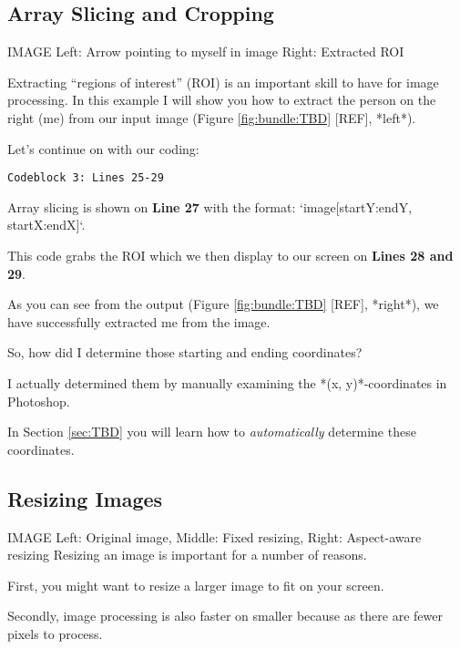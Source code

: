  \subsection{Array Slicing and Cropping}

IMAGE Left: Arrow pointing to myself in image Right: Extracted ROI

Extracting “regions of interest” (ROI) is an important skill to have for image processing. In this example I will show you how to extract the person on the right (me) from our input image (Figure \ref{fig:bundle:TBD} [REF], *left*).

Let’s continue on with our coding:

\begin{verbatim}
Codeblock 3: Lines 25-29
\end{verbatim}

Array slicing is shown on \textbf{Line 27} with the format: `image[startY:endY, startX:endX]`.

This code grabs the ROI which we then display to our screen on \textbf{Lines 28 and 29}.

As you can see from the output (Figure \ref{fig:bundle:TBD} [REF], *right*), we have successfully extracted me from the image.

So, how did I determine those starting and ending coordinates?

I actually determined them by manually examining the *(x, y)*-coordinates in Photoshop.

In Section \ref{sec:TBD} you will learn how to \textit{automatically} determine these coordinates.


\subsection{Resizing Images}

IMAGE Left: Original image, Middle: Fixed resizing, Right: Aspect-aware resizing Resizing an image is important for a number of reasons.

First, you might want to resize a larger image to fit on your screen.

Secondly, image processing is also faster on smaller because as there are fewer pixels to process.

